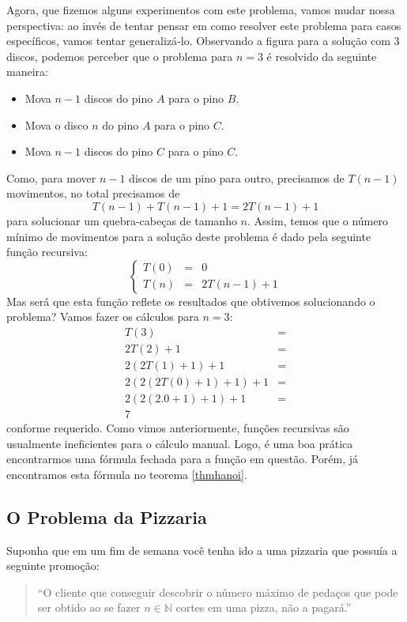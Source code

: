 Agora, que fizemos alguns experimentos com este problema, vamos mudar
nossa perspectiva: ao invés de tentar pensar em como resolver este
problema para casos específicos, vamos tentar
generalizá-lo. Observando a figura para a solução com 3 discos,
podemos perceber que o problema para $n = 3$ é resolvido da seguinte
maneira:
\begin{itemize}
  \item Mova $n - 1$ discos do pino $A$ para o pino $B$.
  \item Mova o disco $n$ do pino $A$ para o pino $C$.
  \item Mova $n - 1$ discos do pino $C$ para o pino $C$.
\end{itemize}
Como, para mover $n - 1$ discos de um pino para outro, precisamos de $T(n
-1)$ movimentos, no total precisamos de
\[
T(n - 1) + T(n - 1) + 1 = 2T(n - 1) + 1
\]
para solucionar um quebra-cabeças de tamanho $n$. Assim, temos que o
número mínimo de movimentos para a solução deste problema é dado pela
seguinte função recursiva:
\[
\left\{
\begin{array}{lcl}
T(0) & = & 0 \\
T(n) & = & 2 T(n - 1) + 1
\end{array}
\right.
\]
Mas será que esta função reflete os resultados que obtivemos
solucionando o problema? Vamos fazer os cálculos para $n = 3$:
\[
\begin{array}{lc}
T(3) & = \\
2 T(2) + 1 & = \\
2(2T(1) + 1) + 1 & =\\
2(2(2T(0) + 1) + 1) + 1 & = \\
2(2(2.0 + 1) + 1) + 1 & = \\
7
\end{array}
\]
conforme requerido. Como vimos anteriormente, funções recursivas são
usualmente ineficientes para o cálculo manual. Logo, é uma boa prática
encontrarmos uma fórmula fechada para a função em questão. Porém, já
encontramos esta fórmula no teorema \ref{thmhanoi}.


\subsection{O Problema da Pizzaria}

Suponha que em um fim de semana você tenha ido a uma pizzaria que
possuía a seguinte promoção:

\begin{quote}
``O cliente que conseguir descobrir o número máximo de pedaços que pode
ser obtido ao se fazer $n \in \mathbb{N}$ cortes em uma pizza, não a pagará.''
\end{quote}

